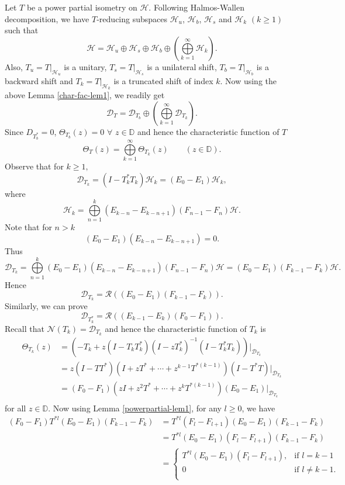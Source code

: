 \documentclass[12pt]{amsart}
\newcommand{\cld}{\mathcal{D}}
\newcommand{\clh}{\mathcal{H}}
\newcommand{\cln}{\mathcal{N}}
\newcommand{\clr}{\mathcal{R}}
\newcommand{\D}{\mathbb{D}}
\newcommand{\dt}{\mathcal{D}}
\theoremstyle{definition}
\theoremstyle{plain}
\theoremstyle{definition}
\numberwithin{equation}{section}
\begin{document}
Let $T$ be a power partial isometry on $\clh$. Following Halmos-Wallen decomposition, we have $T$-reducing subspaces $\clh_u$, $\clh_b$, $\clh_s$ and 
$\clh_k$ $(k \geq 1)$ such that
\[
\clh=\clh_u\oplus\clh_s\oplus\clh_b \oplus \left(\bigoplus\limits_{k=1}^\infty \clh_k\right).
\]
Also, $T_u=T|_{\clh_u}$ is a unitary, $T_s=T|_{\clh_s}$ is a unilateral shift, $T_b=T|_{\clh_b}$ is a backward shift and $T_k=T|_{\clh_k}$ is a truncated shift of index $k$. Now using the above Lemma \ref{char-fac-lem1}, we readily get
\[
\dt_T=\dt_{ T_b}\oplus \left(\bigoplus\limits_{k=1}^\infty \dt_{ T_k}\right).
\]
Since $D_{T_b^{*}} = 0$, $\Theta_{T_b}( z)=0 \,\, \forall \,\,  z \in \D $ and hence the characteristic function of $T$ 
\[
\Theta_T( z)=\bigoplus\limits_{k= 1}^\infty \Theta_{T_k}( z) \qquad (z \in \D).
\]
Observe that for $k\geq 1,$
\[
\cld_{T_k}=(I-T_k^*T_k)\clh_k= (E_0-E_1)\clh_k, 
\]
where 
\[
\clh_k=\bigoplus\limits_{n=1}^k \left(E_{k-n}-E_{k-n+1}\right)\left(F_{n-1}-F_n\right)\clh.
\]
Note that for $n> k$
\[
(E_0-E_1)\left(E_{k-n}-E_{k-n+1}\right) =0.
\]
Thus
\[
\cld_{T_k}= \bigoplus\limits_{n=1}^k (E_0-E_1) \left(E_{k-n}-E_{k-n+1}\right)\left(F_{n-1}-F_n\right)\clh = (E_0-E_1)(F_{k-1}-F_k)\clh.  
\]
Hence  
\[
\dt_{T_k}=\clr ( (E_0-E_1)(F_{k-1}-F_k)).
\]
Similarly, we can prove 
\[
\dt_{T_k^*}=\clr  ((E_{k-1}-E_k)(F_0-F_1)).
\]
Recall that $\cln(T_k) = \cld_{T_k}$ and hence the characteristic function of $T_k$
is
\begin{align*}
\Theta_{T_k}( z) & = \left( -T_k+ z(I-T_kT_k^*)(I- z T_k^*)^{-1}(I-T_k^*T_k )\right)|_{\dt_{T_k}} \\
& = z(I-TT^*)\left(I+ z T^*+\cdots+ z^{k-1} T^{*(k-1)}\right)(I-T^*T)|_{\dt_{T_k}}\\
& = (F_0 -F_1)\left(zI+ z^2 T^*+ \cdots + z^{k} T^{*(k-1)}\right)(E_0-E_1)|_{\dt_{T_k}}\\
\end{align*}
for all $z \in \D$. Now using Lemma \ref{powerpartial-lem1}, for any $l \geq 0$,
we have
\begin{align*}
(F_0 -F_1)T^{*l}(E_0-E_1)(F_{k-1}-F_k) &= T^{*l}(F_l -F_{l+1})(E_0-E_1)(F_{k-1}-F_k)\\
&= T^{*l}(E_0-E_1)(F_l -F_{l+1})(F_{k-1}-F_k)\\
&=\begin{cases}
T^{*l}(E_0-E_1)(F_{l}-F_{l+1}), &  \mbox{if~} l=k-1\\
0 &  \mbox{if~} l \neq k-1.\\
\end{cases}
\end{align*}
\end{document}
